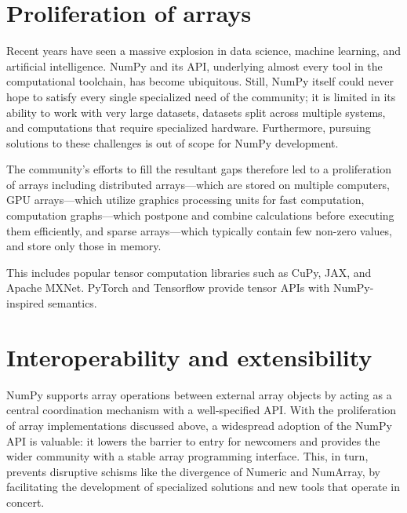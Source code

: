 \section*{Proliferation of arrays}



Recent years have seen a massive explosion in data science, machine learning,
and artificial intelligence.  NumPy and its API, underlying almost every tool
in the computational toolchain, has become ubiquitous.  Still, NumPy itself
could never hope to satisfy every single specialized need of the community; it
is limited in its ability to work with very large datasets, datasets split
across multiple systems, and computations that require specialized hardware.
Furthermore, pursuing solutions to these challenges is out of scope for NumPy
development.

The community's efforts to fill the resultant gaps therefore led to a
proliferation of arrays including distributed arrays---which are stored on
multiple computers, GPU arrays---which utilize graphics processing units for
fast computation, computation graphs---which postpone and combine calculations
before executing them efficiently, and sparse arrays---which typically contain
few non-zero values, and store only those in memory.

This includes popular tensor computation libraries such as
CuPy, JAX, and Apache MXNet.
PyTorch and Tensorflow provide tensor APIs with NumPy-inspired semantics.

\section*{Interoperability and extensibility}

NumPy supports array operations between external array objects by
acting as a central coordination mechanism with a well-specified API.
With the proliferation of array implementations discussed above, a
widespread adoption of the NumPy API is valuable: it lowers the
barrier to entry for newcomers and provides the wider community with a
stable array programming interface. This, in turn, prevents disruptive
schisms like the divergence of Numeric and NumArray, by facilitating
the development of specialized solutions and new tools that operate in
concert.

